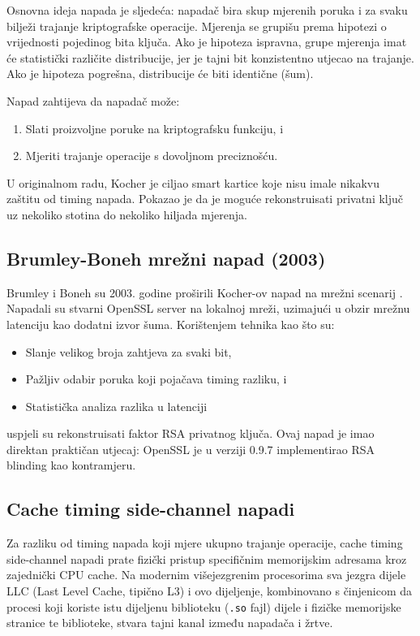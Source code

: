 Osnovna ideja napada je sljedeća: napadač bira skup mjerenih poruka i za svaku bilježi trajanje kriptografske operacije. Mjerenja se grupišu prema hipotezi o vrijednosti pojedinog bita ključa. Ako je hipoteza ispravna, grupe mjerenja imat će statistički različite distribucije, jer je tajni bit konzistentno utjecao na trajanje. Ako je hipoteza pogrešna, distribucije će biti identične (šum).

Napad zahtijeva da napadač može:
\begin{enumerate}
\item Slati proizvoljne poruke na kriptografsku funkciju, i
\item Mjeriti trajanje operacije s dovoljnom preciznošću.
\end{enumerate}

\noindent U originalnom radu, Kocher je ciljao smart kartice koje nisu imale nikakvu zaštitu od timing napada. Pokazao je da je moguće rekonstruisati privatni ključ uz nekoliko stotina do nekoliko hiljada mjerenja.

\subsection{Brumley-Boneh mrežni napad (2003)}

Brumley i Boneh su 2003. godine proširili Kocher-ov napad na mrežni scenarij \cite{brumley2003}. Napadali su stvarni OpenSSL server na lokalnoj mreži, uzimajući u obzir mrežnu latenciju kao dodatni izvor šuma. Korištenjem tehnika kao što su:
\begin{itemize}
\item Slanje velikog broja zahtjeva za svaki bit,
\item Pažljiv odabir poruka koji pojačava timing razliku, i
\item Statistička analiza razlika u latenciji
\end{itemize}
\noindent uspjeli su rekonstruisati faktor RSA privatnog ključa. Ovaj napad je imao direktan praktičan utjecaj: OpenSSL je u verziji 0.9.7 implementirao RSA blinding kao kontramjeru.

\subsection{Cache timing side-channel napadi}
\label{sec:cache_attacks}

Za razliku od timing napada koji mjere ukupno trajanje operacije, cache timing side-channel napadi prate fizički pristup specifičnim memorijskim adresama kroz zajednički CPU cache. Na modernim višejezgrenim procesorima sva jezgra dijele LLC (Last Level Cache, tipično L3) i ovo dijeljenje, kombinovano s činjenicom da procesi koji koriste istu dijeljenu biblioteku (\texttt{.so} fajl) dijele i fizičke memorijske stranice te biblioteke, stvara tajni kanal između napadača i žrtve.

